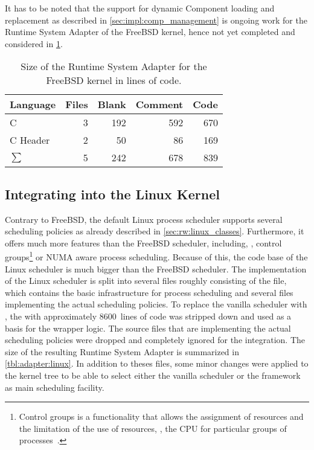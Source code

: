 It has to be noted that the support for dynamic Component loading and replacement as described in \cref{sec:impl:comp_management} is ongoing work for the Runtime System Adapter of the FreeBSD kernel, hence not yet completed and considered in \cref{tbl:adapter:freebsd}.

\begin{table}[!t]
	\caption[Size of the Runtime System Adapter for the FreeBSD kernel.]{Size of the Runtime System Adapter for the FreeBSD kernel in lines of code.}%
	\label{tbl:adapter:freebsd}
	\begin{tabular}{lrrrr}\toprule
		Language & Files   & Blank     & Comment   & Code      \\ \midrule
		C        & \num{3} & \num{192} & \num{592} & \num{670} \\
		C Header & \num{2} & \num{50}  & \num{86}  & \num{169} \\ \midrule
		\(\sum\) & \num{5} & \num{242} & \num{678} & \num{839} \\ \bottomrule
	\end{tabular}
\end{table}

\subsection{Integrating \cobas{} into the Linux Kernel}%
\label{sec:studies:linux}

Contrary to FreeBSD, the default Linux process scheduler supports several scheduling policies as already described in \cref{sec:rw:linux_classes}. Furthermore, it offers much more features than the FreeBSD scheduler, including, \ie{}, control groups\footnote{Control groups is a functionality that allows the assignment of resources and the limitation of the use of resources, \eg{}, the CPU for particular groups of processes~\cite[\cf{}][]{Menage-2016-cgroups}.} or NUMA aware process scheduling. Because of this, the code base of the Linux scheduler is much bigger than the FreeBSD scheduler. The implementation of the Linux scheduler is split into several files roughly consisting of the  file, which contains the basic infrastructure for process scheduling and several files implementing the actual scheduling policies. To replace the vanilla scheduler with \cobas{}, the  with approximately \num{8600}~lines of code was stripped down and used as a basis for the wrapper logic. The source files that are implementing the actual scheduling policies were dropped and completely ignored for the \cobas{} integration. The size of the resulting Runtime System Adapter is summarized in \cref{tbl:adapter:linux}. In addition to theses files, some minor changes were applied to the kernel tree to be able to select either the vanilla scheduler or the \cobas{} framework as main scheduling facility.

